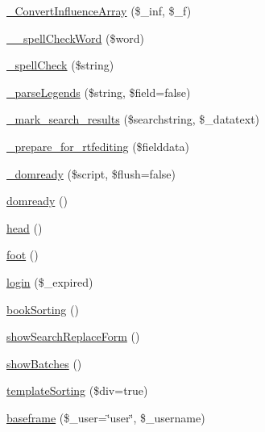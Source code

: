 \begin{DoxyCompactItemize}
\item 
\hyperlink{classrokfor___t_e_m_p_l_a_t_e_s_ade29cc9056f4f1392ee99f3e286a19e7}{\-\_\-\-Convert\-Influence\-Array} (\$\-\_\-inf, \$\-\_\-f)
\item 
\hyperlink{classrokfor___t_e_m_p_l_a_t_e_s_a51fbcf36abca7e50ab9f967433c56c34}{\-\_\-\-\_\-spell\-Check\-Word} (\$word)
\item 
\hyperlink{classrokfor___t_e_m_p_l_a_t_e_s_a451e81d83eaf5fb8a7e20c87b8cdcd1a}{\-\_\-spell\-Check} (\$string)
\item 
\hyperlink{classrokfor___t_e_m_p_l_a_t_e_s_a96507f8a8a7df471816be27e55a9e8aa}{\-\_\-parse\-Legends} (\$string, \$field=false)
\item 
\hyperlink{classrokfor___t_e_m_p_l_a_t_e_s_ac09d3bd9d5d2fa7f6cec4bfaa72927bf}{\-\_\-mark\-\_\-search\-\_\-results} (\$searchstring, \$\-\_\-datatext)
\item 
\hyperlink{classrokfor___t_e_m_p_l_a_t_e_s_ad06dfe33453c2609f6cbf63ce29c555a}{\-\_\-prepare\-\_\-for\-\_\-rtfediting} (\$fielddata)
\item 
\hyperlink{classrokfor___t_e_m_p_l_a_t_e_s_ad4bf69c0384d4812771d01099ea036b5}{\-\_\-domready} (\$script, \$flush=false)
\item 
\hyperlink{classrokfor___t_e_m_p_l_a_t_e_s_a0cb9b1e6bde007e1fe5bfc3495d64c6d}{domready} ()
\item 
\hyperlink{classrokfor___t_e_m_p_l_a_t_e_s_ab4bb77d19c2f3d6b53e20be06e3515bd}{head} ()
\item 
\hyperlink{classrokfor___t_e_m_p_l_a_t_e_s_a04c925be4bd6114f5f2bf174611945fc}{foot} ()
\item 
\hyperlink{classrokfor___t_e_m_p_l_a_t_e_s_a989b17f2566d29628e49e18ca6419a40}{login} (\$\-\_\-expired)
\item 
\hyperlink{classrokfor___t_e_m_p_l_a_t_e_s_a02ab2af5b3683d7b2536e79767c7d1ff}{book\-Sorting} ()
\item 
\hyperlink{classrokfor___t_e_m_p_l_a_t_e_s_a76879d916a5afe3067125dcfe17752c6}{show\-Search\-Replace\-Form} ()
\item 
\hyperlink{classrokfor___t_e_m_p_l_a_t_e_s_a08e0820d7f399639185c8f846140149f}{show\-Batches} ()
\item 
\hyperlink{classrokfor___t_e_m_p_l_a_t_e_s_a06cf17b301b65d7ab7e7f747bb52f644}{template\-Sorting} (\$div=true)
\item 
\hyperlink{classrokfor___t_e_m_p_l_a_t_e_s_a1c10f65af8c0dc296045e9dbaea4ea7d}{baseframe} (\$\-\_\-user=\char`\"{}user\char`\"{}, \$\-\_\-username)
\item 

\end{DoxyCompactItemize}
